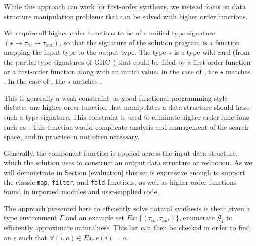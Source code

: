 While this approach can work for first-order synthesis, we instead focus on data structure manipulation problems that can be solved with higher order functions.

We require all higher order functions to be of a unified type signature $(\star \to \tau_{in} \to \tau_{out})$, so that the signature of the solution program is a function mapping the input type to the output type. 
The type $\star$ is a type wild-card (from the partial type signatures of GHC~\cite{ghc}) that could be filled by a first-order function or a first-order function along with an initial value.
In the case of , the $\star$ matches .
In the case of , the $\star$ matches .

This is generally a weak constraint, as good functional programming style dictates any higher order function that manipulates a data structure should have such a type signature.
This constraint is used to eliminate higher order functions such as .
This function would complicate analysis and management of the search space, and in practice in not often necessary.




Generally, the component function is applied across the \textsf{input} data structure, which the \textsf{solution} uses to construct an \textsf{output} data structure or reduction.
As we will demonstrate in Section \ref{evaluation} this set is expressive enough to support the classic \texttt{map}, \texttt{filter}, and \texttt{fold} functions, as well as higher order functions found in imported modules and user-supplied code.

The approach presented here to efficiently solve natural synthesis is then: given a type environment $\Gamma$ and an example set $Ex:\{(\tau_{in},\tau_{out})\}$, enumerate $\mathcal{G}_I$ to efficiently approximate naturalness.
This list can then be checked in order to find an $e$ such that $\forall (i,o) \in Ex, e (i) = o$.
